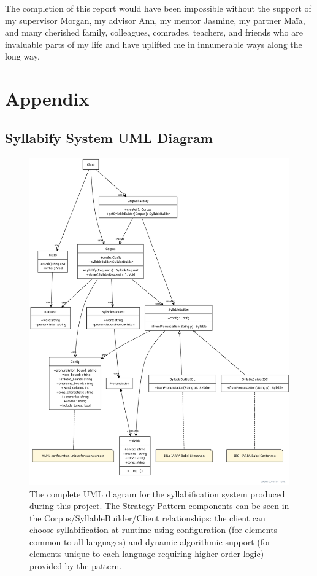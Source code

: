 \documentclass[11pt]{article}
\begin{document}
The completion of this report would have been impossible without the support of my supervisor Morgan, my advisor Ann, my mentor Jasmine, my partner Ma\"ia, and many cherished family, colleagues, comrades, teachers, and friends who are invaluable parts of my life and have uplifted me in innumerable ways along the long way.

\newpage
\section{Appendix}
\subsection{Syllabify System UML Diagram}
\begin{figure}[h]
  \centering
  \includegraphics[scale=0.3]{UMLdiag.png}
  \caption{The complete UML diagram for the syllabification system produced during this project. The Strategy Pattern components can be seen in the Corpus/SyllableBuilder/Client relationships: the client can choose syllabification at runtime using configuration (for elements common to all languages) and dynamic algorithmic support (for elements unique to each language requiring higher-order logic) provided by the pattern.}
  \label{fig:UMLdiag}
\end{figure}

\newpage

\vskip 0.2in


\end{document}
